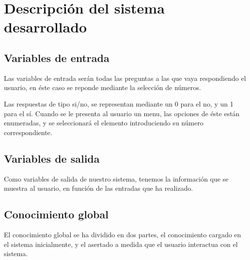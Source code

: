 
\chapter{Descripción del sistema desarrollado}


\section{Variables de entrada}

Las variables de entrada serán todas las preguntas a las que vaya respondiendo el usuario, en éste caso se reponde mediante la selección de números.

Las respuestas de tipo si/no, se representan  mediante un 0 para el no, y un 1 para el sí. Cuando se le presenta al usuario un menu, las opciones de éste están enumeradas, y se seleccionará el elemento introduciendo su número correspondiente.

\section{Variables de salida}

Como variables de salida de nuestro sistema, tenemos la información que se muestra al usuario, en función de las entradas que ha realizado.

\section{Conocimiento global}


El conocimiento global se ha dividido en dos partes, el conocimiento cargado en el sistema inicialmente, y el asertado a medida que el usuario interactua con el sistema.

